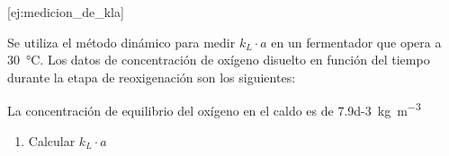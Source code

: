 \documentclass{AsignaturaResumen}
\begin{document}
[ej:medicion_de_kla]{
    Se utiliza el método dinámico para medir $k_{L}\cdot a$ en un fermentador que opera a \qty{30}{\degreeCelsius}. Los datos de concentración de oxígeno disuelto en función del tiempo durante la etapa de reoxigenación son los siguientes:
    \begin{table}[H]
    \end{table}
    La concentración de equilibrio del oxígeno en el caldo es de \qty{7.9d-3}{\kg\per\m\cubed}
    \begin{enumerate}\item Calcular $k_{L}\cdot a$ \end{enumerate}
}



\ifx\ISMAIN\undefined
    
\end{document}
